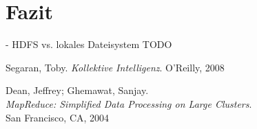 \documentclass[a4paper]{llncs}
\begin{document}
\section{Fazit}
- HDFS vs. lokales Dateisystem
TODO

\begin{thebibliography}{------------}

  Segaran, Toby.
  {\em Kollektive Intelligenz}.
  O'Reilly, 2008

  Dean, Jeffrey; Ghemawat, Sanjay.\\
  {\em MapReduce: Simplified Data Processing on Large Clusters}.\\
  San Francisco, CA, 2004
   
\end{thebibliography}
\end{document}
